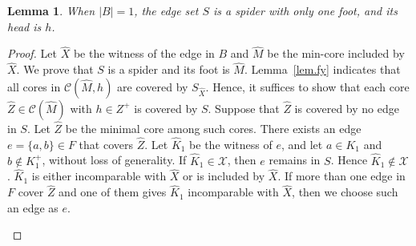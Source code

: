 \documentclass[11pt]{article}
\newtheorem{lemma}{Lemma}
\newcommand{\Cfam}{\mathcal{C}}
\begin{document}
\begin{lemma}\label{lem.spider1}
 When $|B|=1$,
 the edge set $S$
  is a spider with only one foot, and its head is $h$.
\end{lemma}
\begin{proof}
 Let $\hat{X}$ be the witness of the edge in $B$
 and $\hat{M}$ be the min-core included by $\hat{X}$.
 We prove that $S$ is a spider and its foot is $\hat{M}$.
 Lemma~\ref{lem.fy} indicates that all cores in $\Cfam(\hat{M},h)$ are
 covered by $S_{\hat{X}}$.
 Hence, it suffices to show that
 each core $\hat{Z} \in \Cfam(\hat{M})$ with $h \in Z^+$ is covered by
 $S$.
 Suppose that $\hat{Z}$ is covered by no edge in $S$.
 Let $\hat{Z}$ be the minimal core among such cores.
 There exists an edge $e=\{a,b\} \in F$ that covers $\hat{Z}$.
 Let $\hat{K}_1$ be the witness of $e$, and let $a \in K_1$ and
 $b\not\in K^+_1$, without loss of generality. If $\hat{K}_1\in \mathcal{X}$,
 then $e$ remains in $S$.
 Hence $\hat{K}_1\not\in \mathcal{X}$.
 $\hat{K}_1$ is either incomparable with
 $\hat{X}$ or is included by $\hat{X}$.
 If more than one edge in $F$ cover $\hat{Z}$ and one of them
 gives $\hat{K}_1$ incomparable with $\hat{X}$,
 then we choose such an edge as $e$.

 \begin{figure}[th]
  \centering
\end{figure}
\end{proof}
\end{document}
